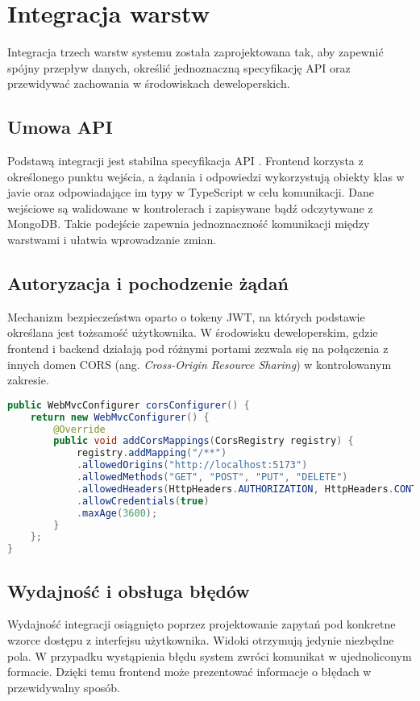 \section{Integracja warstw}
Integracja trzech warstw systemu została zaprojektowana tak, aby zapewnić spójny przepływ danych, określić jednoznaczną specyfikację API oraz przewidywać zachowania w środowiskach deweloperskich.
\subsection*{Umowa API}
Podstawą integracji jest stabilna specyfikacja API \cite{API}. Frontend korzysta z określonego punktu wejścia, a żądania i odpowiedzi wykorzystują obiekty klas w javie oraz odpowiadające im typy w TypeScript w celu komunikacji. Dane wejściowe są walidowane w kontrolerach i zapisywane bądź odczytywane z MongoDB. Takie podejście zapewnia jednoznaczność komunikacji między warstwami i ułatwia wprowadzanie zmian. 
\subsection*{Autoryzacja i pochodzenie żądań}
Mechanizm bezpieczeństwa oparto o tokeny JWT, na których podstawie określana jest tożsamość użytkownika. W środowisku deweloperskim, gdzie frontend i backend działają pod różnymi portami zezwala się na połączenia z innych domen CORS (ang. \textit{Cross-Origin Resource Sharing}) w kontrolowanym zakresie.
\begin{lstlisting}[language={java}, caption={Konfiguracja CROS}, label={lst:Java-CROS}]
public WebMvcConfigurer corsConfigurer() {
	return new WebMvcConfigurer() {
		@Override
		public void addCorsMappings(CorsRegistry registry) {
			registry.addMapping("/**")
			.allowedOrigins("http://localhost:5173")
			.allowedMethods("GET", "POST", "PUT", "DELETE")
			.allowedHeaders(HttpHeaders.AUTHORIZATION, HttpHeaders.CONTENT_TYPE, HttpHeaders.ACCEPT)
			.allowCredentials(true)
			.maxAge(3600);
		}
	};
}
\end{lstlisting}
\subsection*{Wydajność i obsługa błędów}
Wydajność integracji osiągnięto poprzez projektowanie zapytań pod konkretne wzorce dostępu z interfejsu użytkownika. Widoki otrzymują jedynie niezbędne pola. W przypadku wystąpienia błędu system zwróci komunikat w ujednoliconym formacie. Dzięki temu frontend może prezentować informacje o błędach w przewidywalny sposób.

